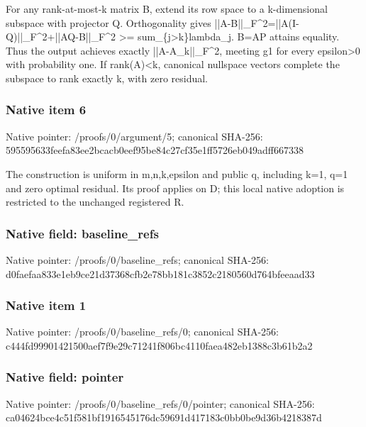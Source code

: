 \documentclass[10pt,a4paper]{article}
\begin{document}
\begingroup\raggedright\sloppy For any rank-at-most-k matrix B,\allowbreak{} extend its row space to a k-dimensional subspace with projector Q. Orthogonality gives ||A-B||\_\allowbreak{}F\textasciicircum{}2=\allowbreak{}||A(I-Q)||\_\allowbreak{}F\textasciicircum{}2+||AQ-B||\_\allowbreak{}F\textasciicircum{}2 >=\allowbreak{} sum\_\allowbreak{}\{j>k\}lambda\_\allowbreak{}j. B=\allowbreak{}AP attains equality. Thus the output achieves exactly ||A-A\_\allowbreak{}k||\_\allowbreak{}F\textasciicircum{}2,\allowbreak{} meeting g1 for every epsilon>0 with probability one. If rank(A)<k,\allowbreak{} canonical nullspace vectors complete the subspace to rank exactly k,\allowbreak{} with zero residual.\par\endgroup

\subsubsection{Native item 6}
Native pointer: /proofs/0/argument/5; canonical SHA-256: 595595633feefa83ee2bcacb0eef95be84c27cf35e1ff5726eb049adff667338

\begingroup\raggedright\sloppy The construction is uniform in m,\allowbreak{}n,\allowbreak{}k,\allowbreak{}epsilon and public q,\allowbreak{} including k=\allowbreak{}1,\allowbreak{} q=\allowbreak{}1 and zero optimal residual. Its proof applies on D;\allowbreak{} this local native adoption is restricted to the unchanged registered R.\par\endgroup

\subsubsection{Native field: baseline\_\allowbreak{}refs}
Native pointer: /proofs/0/baseline\_\allowbreak{}refs; canonical SHA-256: d0faefaa833e1eb9ce21d37368cfb2e78bb181c3852c2180560d764bfeeaad33

\subsubsection{Native item 1}
Native pointer: /proofs/0/baseline\_\allowbreak{}refs/0; canonical SHA-256: c444fd99901421500aef7f9e29c71241f806bc4110faea482eb1388c3b61b2a2

\subsubsection{Native field: pointer}
Native pointer: /proofs/0/baseline\_\allowbreak{}refs/0/pointer; canonical SHA-256: ca04624bce4c51f581bf1916545176dc59691d417183c0bb0be9d36b4218387d
\end{document}
